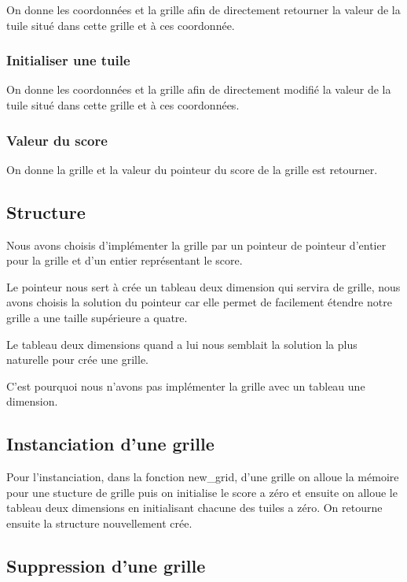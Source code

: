 \documentclass{article}
\begin{document}
On donne les coordonnées et la grille afin de directement retourner la valeur de la tuile situé dans cette grille et à ces coordonnée.

\subsubsection{Initialiser une tuile}

On donne les coordonnées et la grille afin de directement modifié la valeur de la tuile situé dans cette grille et à ces coordonnées.

\subsubsection{Valeur du score}

On donne la grille et la valeur du pointeur du score de la grille est retourner.


\subsection{Structure}

Nous avons choisis d'implémenter la grille par un pointeur de pointeur d'entier pour la grille et d'un entier représentant le score.

Le pointeur nous sert à crée un tableau deux dimension qui servira de grille, nous avons choisis la solution du pointeur car elle permet de facilement étendre notre grille a une taille supérieure a quatre.

Le tableau deux dimensions quand a lui nous semblait la solution la plus naturelle pour crée une grille.

C'est pourquoi nous n'avons pas implémenter la grille avec un tableau une dimension.

\subsection{Instanciation d'une grille}

Pour l'instanciation, dans la fonction new\_grid, d'une grille on alloue la mémoire pour une stucture de grille puis on initialise le score a zéro et ensuite on alloue le tableau deux dimensions en initialisant chacune des tuiles a zéro. On retourne ensuite la structure nouvellement crée.

\subsection{Suppression d'une grille}
\end{document}

